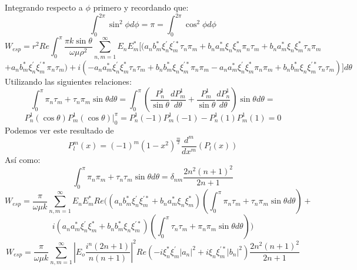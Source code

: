 \documentclass[letterpaper, 11pt]{article}
\begin{document}
Integrando respecto a $\phi$ primero y recordando que:
\begin{equation}
    \int_0^{2\pi}\sin^2\phi d\phi=\pi=\int_0^{2\pi}\cos^2\phi d\phi
\end{equation}
\begin{equation*}
    W_{esp}=r^2Re\int_0^\pi \frac{\pi k \sin \theta}{\omega \mu \rho^2}\sum_{n,m=1}^\infty E_n E_m^{*}[(a_nb_m^*\xi_n^{'}\xi_m^{'*}\tau_n \pi_m + b_n a_m^{*} \xi_n\xi_m^{*}\pi_n\tau_m+b_na_m^*\xi_n\xi_m^*\tau_n\pi_m
\end{equation*}
\begin{equation*}
    +a_nb_m^*\xi_n^{'}\xi_m^{'*}\pi_n\tau_m)+i(-a_na_m^{*}\xi_n^{'}\xi_m^{*}\tau_n\tau_m+b_nb_m^{*}\xi_n\xi_m^{'*}\pi_n\pi_m-a_na_m^*\xi_n^{'}\xi_m^{*}\pi_n\pi_m+b_nb_m^*\xi_n\xi_m^{'*}\tau_n\tau_m)]d\theta
\end{equation*}
Utilizando las siguientes relaciones:
\begin{equation*}
    \int_0^{\pi}\pi_n \tau_m+\tau_n \pi_m \sin\theta d\theta=\int_0^{\pi}(\frac{P_n^1}{\sin\theta} \frac{dP_m^1}{d\theta}+\frac{P_m^{1}}{\sin\theta}\frac{dP_n^{1}}{d\theta})\sin{\theta}d\theta=
\end{equation*}
\begin{equation*}
    P_n^1(\cos\theta)P_m^1(\cos\theta)|_0^\pi=P_n^1(-1)P_m^1(-1)-P_n^1(1)P_m^1(1)=0
\end{equation*}
Podemos ver este resultado de 
\begin{equation*}
    P_l^m(x)=(-1)^m(1-x^2)^{\frac{m}{2}}\frac{d^m}{dx^m}(P_l(x))
\end{equation*}
Así como:
\begin{equation*}
    \int_0^{\pi}\pi_n \pi_m+\tau_n \tau_m \sin\theta d\theta=\delta_{nm}\frac{2n^2(n+1)^2}{2n+1}
\end{equation*}
\begin{equation*}
    W_{esp}=\frac{\pi}{\omega\mu k}\sum_{n,m=1}^\infty E_nE_m^*Re((a_nb_m^*\xi_n^{'}\xi_m^{'*}+b_na_m^*\xi_n\xi_m^{*})(\int_0^{\pi}\pi_n \tau_m+\tau_n \pi_m \sin\theta d\theta)+
\end{equation*}
\begin{equation*}
    i(a_na_m^*\xi_n^{'}\xi_m^{*}+b_nb_m^*\xi_n\xi_m^{'*})(\int_0^{\pi}\tau_n \tau_m+\pi_n \pi_m \sin\theta d\theta))
\end{equation*}
\begin{equation*}
     W_{esp}=\frac{\pi}{\omega\mu k}\sum_{n,m=1}^\infty |E_o\frac{i^n(2n+1)}{n(n+1)}|^2 Re(-i\xi_n^*\xi_m^{'}|a_n|^2+i\xi_n\xi_m^{'*}|b_n|^2)\frac{2n^2(n+1)^2}{2n+1}
\end{equation*}
\end{document}
